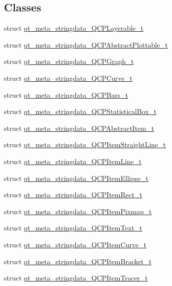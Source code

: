 \subsection*{Classes}
\begin{DoxyCompactItemize}
\item 
struct \hyperlink{a00016_d8/d17/a00114}{qt\+\_\+meta\+\_\+stringdata\+\_\+\+Q\+C\+P\+Layerable\+\_\+t}
\item 
struct \hyperlink{a00016_da/d74/a00099}{qt\+\_\+meta\+\_\+stringdata\+\_\+\+Q\+C\+P\+Abstract\+Plottable\+\_\+t}
\item 
struct \hyperlink{a00016_d5/d1e/a00103}{qt\+\_\+meta\+\_\+stringdata\+\_\+\+Q\+C\+P\+Graph\+\_\+t}
\item 
struct \hyperlink{a00016_d9/dcc/a00102}{qt\+\_\+meta\+\_\+stringdata\+\_\+\+Q\+C\+P\+Curve\+\_\+t}
\item 
struct \hyperlink{a00016_d4/d3a/a00101}{qt\+\_\+meta\+\_\+stringdata\+\_\+\+Q\+C\+P\+Bars\+\_\+t}
\item 
struct \hyperlink{a00016_d9/d4b/a00117}{qt\+\_\+meta\+\_\+stringdata\+\_\+\+Q\+C\+P\+Statistical\+Box\+\_\+t}
\item 
struct \hyperlink{a00016_d1/d84/a00097}{qt\+\_\+meta\+\_\+stringdata\+\_\+\+Q\+C\+P\+Abstract\+Item\+\_\+t}
\item 
struct \hyperlink{a00016_dd/d6d/a00111}{qt\+\_\+meta\+\_\+stringdata\+\_\+\+Q\+C\+P\+Item\+Straight\+Line\+\_\+t}
\item 
struct \hyperlink{a00016_d1/dd6/a00108}{qt\+\_\+meta\+\_\+stringdata\+\_\+\+Q\+C\+P\+Item\+Line\+\_\+t}
\item 
struct \hyperlink{a00016_df/d98/a00107}{qt\+\_\+meta\+\_\+stringdata\+\_\+\+Q\+C\+P\+Item\+Ellipse\+\_\+t}
\item 
struct \hyperlink{a00016_d4/d81/a00110}{qt\+\_\+meta\+\_\+stringdata\+\_\+\+Q\+C\+P\+Item\+Rect\+\_\+t}
\item 
struct \hyperlink{a00016_dd/d42/a00109}{qt\+\_\+meta\+\_\+stringdata\+\_\+\+Q\+C\+P\+Item\+Pixmap\+\_\+t}
\item 
struct \hyperlink{a00016_db/d57/a00112}{qt\+\_\+meta\+\_\+stringdata\+\_\+\+Q\+C\+P\+Item\+Text\+\_\+t}
\item 
struct \hyperlink{a00016_d7/d70/a00106}{qt\+\_\+meta\+\_\+stringdata\+\_\+\+Q\+C\+P\+Item\+Curve\+\_\+t}
\item 
struct \hyperlink{a00016_d3/d32/a00105}{qt\+\_\+meta\+\_\+stringdata\+\_\+\+Q\+C\+P\+Item\+Bracket\+\_\+t}
\item 
struct \hyperlink{a00016_d3/d00/a00113}{qt\+\_\+meta\+\_\+stringdata\+\_\+\+Q\+C\+P\+Item\+Tracer\+\_\+t}

\end{DoxyCompactItemize}
